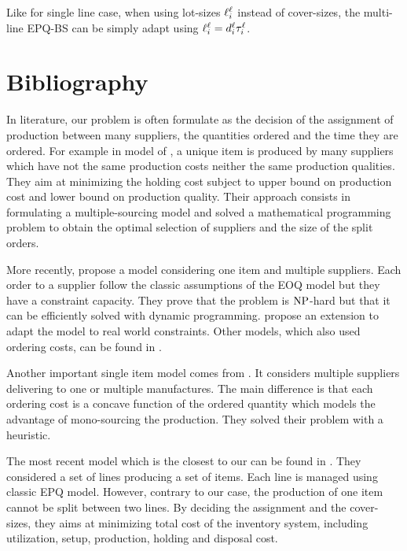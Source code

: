 Like for single line case, when using lot-sizes $\ell_i^{\ell}$ instead of cover-sizes, the multi-line EPQ-BS can be simply adapt using $\ell_i^{\ell}=d_i^{\ell}\tau_i^{\ell}$.



\section{Bibliography}



In literature, our problem is often formulate as the decision of the assignment of production between many suppliers, the quantities ordered and the time they are ordered.
For example in model of \cite{Hong1992}, a unique item is produced by many suppliers which have not the same production costs neither the same production qualities.
They aim at minimizing the holding cost subject to upper bound on production cost and lower bound on production quality.
Their approach consists in formulating a multiple-sourcing model and solved a mathematical programming problem to obtain the optimal selection of suppliers and the size of the split orders.


More recently, \cite{Rosenblatt1998} propose a model considering one item and multiple suppliers.
Each order to a supplier follow the classic assumptions of the EOQ model but they have a constraint capacity.
They prove that the problem is $\operatorname{NP}$-hard but that it can be efficiently solved with dynamic programming.
\cite{Chang2006} propose an extension to adapt the model to real world constraints.
Other models, which also used ordering costs, can be found in \cite{Kim2005,Park2006}.


Another important single item model comes from \cite{Chauhan2003}.
It considers multiple suppliers delivering to one or multiple manufactures.
The main difference is that each ordering cost is a concave function of the ordered quantity which models the advantage of mono-sourcing the production.
They solved their problem with a heuristic.


The most recent model which is the closest to our can be found in \cite{Nobil2016}.
They considered a set of lines producing a set of items.
Each line is managed using classic EPQ model.
However, contrary to our case, the production of one item cannot be split between two lines.
By deciding the assignment and the cover-sizes, they aims at minimizing total cost of the inventory system, including utilization, setup, production, holding and disposal cost.




